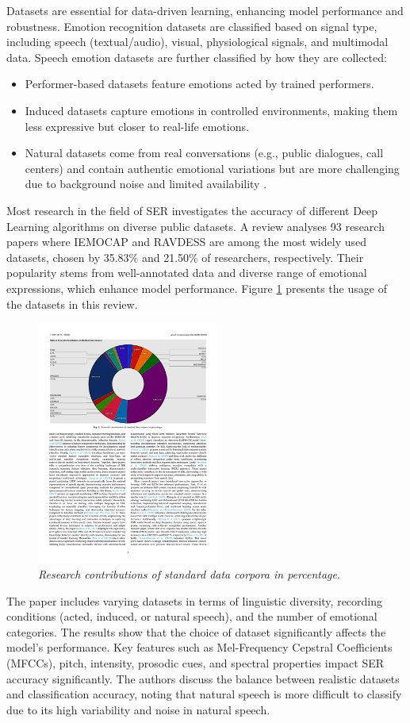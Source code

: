Datasets are essential for data-driven learning, enhancing model performance and robustness. Emotion recognition datasets are classified based on signal type, including speech (textual/audio), visual, physiological signals, and multimodal data. Speech emotion datasets are further classified by how they are collected: 
\begin{itemize}
    \item Performer-based datasets feature emotions acted by trained performers. 
    \item Induced datasets capture emotions in controlled environments, making them less expressive but closer to real-life emotions. 
    \item Natural datasets come from real conversations (e.g., public dialogues, call centers) and contain authentic emotional variations but are more challenging due to background noise and limited availability \autocite{Cai2023}. 
\end{itemize}
Most research in the field of SER investigates the accuracy of different Deep Learning algorithms on diverse public datasets. A review \autocite{Rathi2024} analyses 93 research papers where IEMOCAP and RAVDESS are among the most widely used datasets, chosen by 35.83\% and 21.50\% of researchers, respectively. Their popularity stems from well-annotated data and diverse range of emotional expressions, which enhance model performance. Figure \ref{fig:datasets-percentage} presents the usage of the datasets in this review.  
\begin{figure}[ht]
    \centering
    \includegraphics[height=8cm]{png/background/datasets-diagram.pdf}
    \caption{\textit{Research contributions of standard data corpora in percentage}\autocite{Rathi2024}.}
    \label{fig:datasets-percentage}
\end{figure}
The paper \autocite{Rathi2024} includes varying datasets in terms of linguistic diversity, recording conditions (acted, induced, or natural speech), and the number of emotional categories. The results show that the choice of dataset significantly affects the model's performance. Key features such as Mel-Frequency Cepstral Coefficients (MFCCs), pitch, intensity, prosodic cues, and spectral properties impact SER accuracy significantly. The authors discuss the balance between realistic datasets and classification accuracy, noting that natural speech is more difficult to classify due to its high variability and noise in natural speech. 

